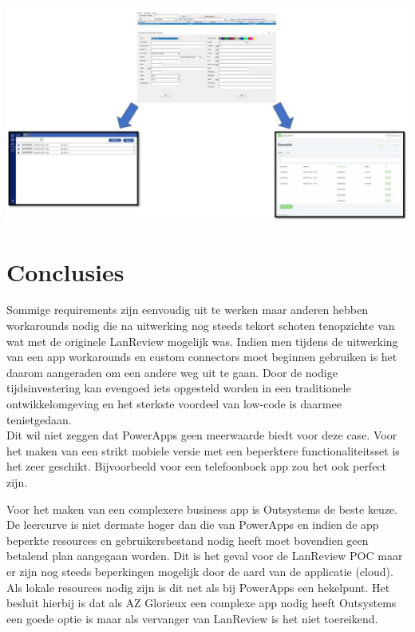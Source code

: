 \documentclass[a0,portrait]{a0poster}
\begin{document}
\begin{multicols}{2}
\begin{center}\vspace{1cm}
    \includegraphics[width=1.0\linewidth]{poc-tri}
\end{center}\vspace{1cm}




\color{HoGentAccent1} 
\section*{Conclusies}
\color{black}
Sommige requirements zijn eenvoudig uit te werken maar anderen hebben workarounds nodig die na uitwerking nog steeds tekort schoten tenopzichte van wat met de originele LanReview mogelijk was. Indien men tijdens de uitwerking van een app workarounds en custom connectors moet beginnen gebruiken is het daarom aangeraden om een andere weg uit te gaan. Door de nodige tijdsinvestering kan evengoed iets opgesteld worden in een traditionele ontwikkelomgeving en het sterkste voordeel van low-code is daarmee tenietgedaan.\\
Dit wil niet zeggen dat PowerApps geen meerwaarde biedt voor deze case. Voor het maken van een strikt mobiele versie met een beperktere functionaliteitsset is het zeer geschikt. Bijvoorbeeld voor een telefoonboek app zou het ook perfect zijn.

Voor het maken van een complexere business app is Outsystems de beste keuze. De leercurve is niet dermate hoger dan die van PowerApps en indien de app beperkte resources en gebruikersbestand nodig heeft moet bovendien geen betalend plan aangegaan worden. Dit is het geval voor de LanReview POC maar er zijn nog steeds beperkingen mogelijk door de aard van de applicatie (cloud). Als lokale resources nodig zijn is dit net als bij PowerApps een hekelpunt. Het besluit hierbij is dat als AZ Glorieux een complexe app nodig heeft Outsystems een goede optie is maar als vervanger van LanReview is het niet toereikend.


\end{multicols}
\end{document}

